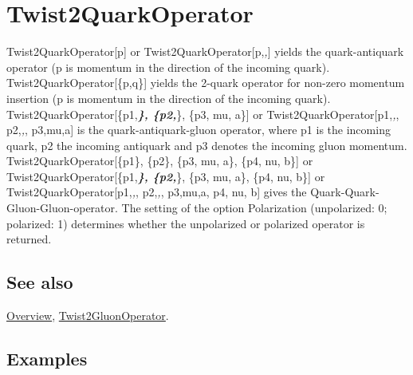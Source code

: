 \documentclass[../FeynCalcManual.tex]{subfiles}
\begin{document}
\hypertarget{twist2quarkoperator}{%
\section{Twist2QuarkOperator}\label{twist2quarkoperator}}

Twist2QuarkOperator{[}p{]} or Twist2QuarkOperator{[}p,\emph{,}{]} yields
the quark-antiquark operator (p is momentum in the direction of the
incoming quark). Twist2QuarkOperator{[}\{p,q\}{]} yields the 2-quark
operator for non-zero momentum insertion (p is momentum in the direction
of the incoming quark). Twist2QuarkOperator{[}\{p1,\textbf{\emph{\},
\{p2,}}\}, \{p3, mu, a\}{]} or Twist2QuarkOperator{[}p1,\emph{,},
p2,\emph{,}, p3,mu,a{]} is the quark-antiquark-gluon operator, where p1
is the incoming quark, p2 the incoming antiquark and p3 denotes the
incoming gluon momentum. Twist2QuarkOperator{[}\{p1\}, \{p2\}, \{p3, mu,
a\}, \{p4, nu, b\}{]} or Twist2QuarkOperator{[}\{p1,\textbf{\emph{\},
\{p2,}}\}, \{p3, mu, a\}, \{p4, nu, b\}{]} or
Twist2QuarkOperator{[}p1,\emph{,}, p2,\emph{,}, p3,mu,a, p4, nu, b{]}
gives the Quark-Quark-Gluon-Gluon-operator. The setting of the option
Polarization (unpolarized: 0; polarized: 1) determines whether the
unpolarized or polarized operator is returned.

\subsection{See also}

\hyperlink{toc}{Overview},
\hyperlink{twist2gluonoperator}{Twist2GluonOperator}.

\subsection{Examples}
\end{document}
